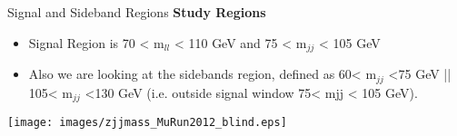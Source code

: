 \begin{frame}{Signal and Sideband Regions}
  {\bf Study Regions}
  \begin{itemize}
  \item 
   Signal Region is 70 < m$_{ll}$ < 110 GeV and 75 < m$_{jj}$ < 105 GeV
  \item 
    Also we are looking at the sidebands region, defined as 60< m$_{jj}$ <75 GeV || 105< m$_{jj}$ <130 GeV (i.e. outside signal window 75< mjj < 105 GeV).
  \end{itemize}
  \begin{center}
    \texttt{[image: images/zjjmass\_MuRun2012\_blind.eps]}
  \end{center}

  
\end{frame}




